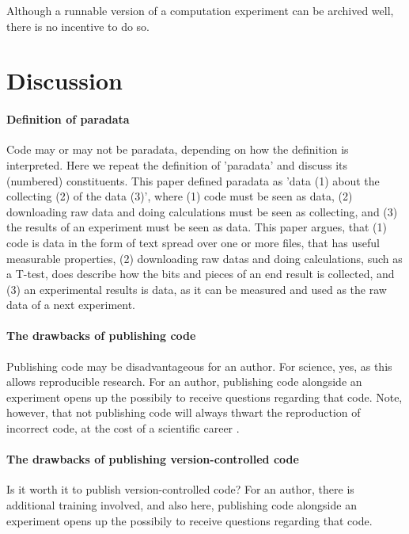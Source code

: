 Although a runnable version of a computation experiment can be archived well, 
there is no incentive to do so.

\section{Discussion}

\paragraph{Definition of paradata}

Code may or may not be paradata, depending on how the definition
is interpreted.
Here we repeat the definition of 'paradata' and discuss 
its (numbered) constituents.
This paper defined paradata as 'data (1) about the collecting (2) of the data (3)',
where (1) code must be seen as data, (2) downloading raw data
and doing calculations must be seen as collecting, and (3) the
results of an experiment must be seen as data.
This paper argues, that (1) code is data in the form of text spread
over one or more files, that has useful measurable properties, 
(2) downloading raw datas and doing calculations, such as a T-test,
does describe how the bits and pieces of an end result is collected,
and (3) an experimental results is data, as it can be measured and
used as the raw data of a next experiment.

\paragraph{The drawbacks of publishing code}

Publishing code may be disadvantageous for an author.
For science, yes, as this allows reproducible research.
For an author, publishing code alongside an experiment opens up
the possibily to receive questions regarding that code.
Note, however, that not publishing code will always thwart
the reproduction of incorrect code, at the cost of a scientific
career \cite{baggerly2009deriving}.

\paragraph{The drawbacks of publishing version-controlled code}

Is it worth it to publish version-controlled code?
For an author, 
there is additional training involved, and also here,
publishing code alongside an experiment opens up
the possibily to receive questions regarding that code.

